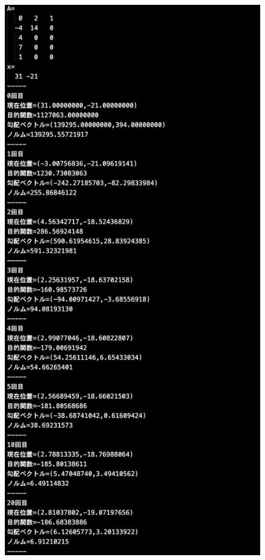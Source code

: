 \documentclass[12pt]{jarticle}
\begin{document}
\clearpage
\begin{figure}[h]
    \begin{center}
        \includegraphics[scale=0.2]{kadai1_2s_out3_3_1.png}
    \end{center}

\end{figure}
\end{document}
